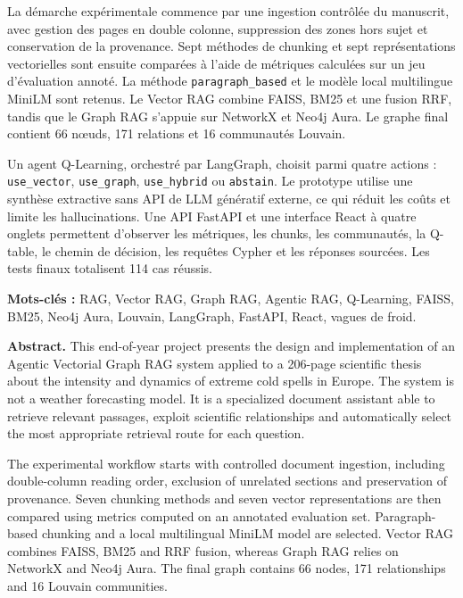 \documentclass[12pt,a4paper,oneside]{report}
\newcommand{\tech}[1]{\texttt{#1}}
\begin{document}
La démarche expérimentale commence par une ingestion contrôlée du manuscrit, avec gestion des pages en double colonne, suppression des zones hors sujet et conservation de la provenance. Sept méthodes de chunking et sept représentations vectorielles sont ensuite comparées à l'aide de métriques calculées sur un jeu d'évaluation annoté. La méthode \tech{paragraph\_based} et le modèle local multilingue MiniLM sont retenus. Le Vector RAG combine FAISS, BM25 et une fusion RRF, tandis que le Graph RAG s'appuie sur NetworkX et Neo4j Aura. Le graphe final contient 66 nœuds, 171 relations et 16 communautés Louvain.

Un agent Q-Learning, orchestré par LangGraph, choisit parmi quatre actions : \tech{use\_vector}, \tech{use\_graph}, \tech{use\_hybrid} ou \tech{abstain}. Le prototype utilise une synthèse extractive sans API de LLM génératif externe, ce qui réduit les coûts et limite les hallucinations. Une API FastAPI et une interface React à quatre onglets permettent d'observer les métriques, les chunks, les communautés, la Q-table, le chemin de décision, les requêtes Cypher et les réponses sourcées. Les tests finaux totalisent 114 cas réussis.

\vspace{0.5cm}
\textbf{Mots-clés :} RAG, Vector RAG, Graph RAG, Agentic RAG, Q-Learning, FAISS, BM25, Neo4j Aura, Louvain, LangGraph, FastAPI, React, vagues de froid.

\vspace{0.8cm}
\textbf{Abstract.} This end-of-year project presents the design and implementation of an Agentic Vectorial Graph RAG system applied to a 206-page scientific thesis about the intensity and dynamics of extreme cold spells in Europe. The system is not a weather forecasting model. It is a specialized document assistant able to retrieve relevant passages, exploit scientific relationships and automatically select the most appropriate retrieval route for each question.

The experimental workflow starts with controlled document ingestion, including double-column reading order, exclusion of unrelated sections and preservation of provenance. Seven chunking methods and seven vector representations are then compared using metrics computed on an annotated evaluation set. Paragraph-based chunking and a local multilingual MiniLM model are selected. Vector RAG combines FAISS, BM25 and RRF fusion, whereas Graph RAG relies on NetworkX and Neo4j Aura. The final graph contains 66 nodes, 171 relationships and 16 Louvain communities.
\end{document}
